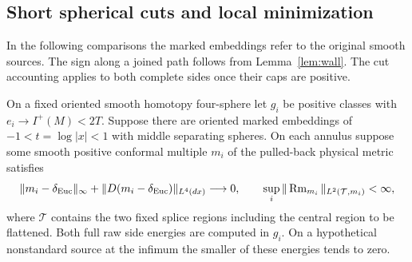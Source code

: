 \subsection{Short spherical cuts and local minimization}
In the following comparisons the marked embeddings refer to the original
smooth sources. The sign along a joined path follows from Lemma~\ref{lem:wall}.
The cut accounting applies to both complete sides once their caps are positive.

\begin{proposition}\label{prop:short-cut}
On a fixed oriented smooth homotopy four-sphere let \(g_i\) be positive
classes with \(e_i\to I^+(M)<2T\). Suppose there are oriented marked
embeddings of \(-1<t=\log|x|<1\) with middle separating spheres.
On each annulus suppose some smooth positive conformal multiple \(m_i\) of
the pulled-back physical metric satisfies
\[
 \|m_i-\delta_{\rm Euc}\|_\infty+
 \|D(m_i-\delta_{\rm Euc})\|_{L^4(dx)}\longrightarrow0,\qquad
 \sup_i\|\operatorname{Rm}_{m_i}\|_{L^2(\mathcal T,m_i)}<\infty ,
\]
where \(\mathcal T\) contains the two fixed splice regions including
the central region to be flattened. Both full raw side energies are
computed in \(g_i\). On a hypothetical nonstandard source at the
infimum the smaller of these energies tends to zero.
\end{proposition}

